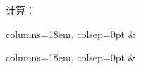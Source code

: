 \begin{enhancedline}
\begin{xiaoxiaotis}
\end{xiaoxiaotis}


\liti 计算：
\begin{xiaoxiaotis}

    \hspace*{1.5em} \begin{tblr}{columns={18em, colsep=0pt}}
         & 
    \end{tblr}

\resetxxt
\jie \begin{tblr}[t]{columns={18em, colsep=0pt}}
        & 
\end{tblr}
\end{xiaoxiaotis}
\end{enhancedline}

